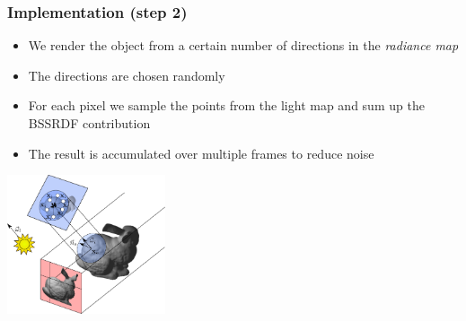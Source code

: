 \documentclass{beamer}
\begin{document}
\begin{frame}
    \frametitle{Implementation (step 2)}
			\begin{itemize}
			\item We render the object from a certain number of directions in the \emph{radiance map}
			\item The directions are chosen randomly 
			\item For each pixel we sample the points from the light map and sum up the BSSRDF contribution
			\item The result is accumulated over multiple frames to reduce noise
			\end{itemize}
			\centering
			\includegraphics[width=0.35\textwidth]{step2.jpg} 
\end{frame}
\end{document}
